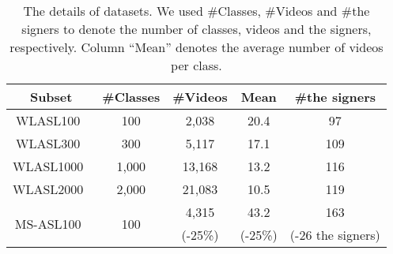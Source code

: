 \documentclass[journal]{IEEEtran}
\begin{document}
\begin{table}[tb]
    \centering
    \caption{The details of datasets. We used \#Classes, \#Videos and \#the signers to denote the number of classes, videos and the signers, respectively. Column ``Mean'' denotes the average number of videos per class.}
    \begin{tabular}{ccccc} \hline
        Subset & \#Classes & \#Videos & Mean & \#the signers \\ \hline \hline
        WLASL100~\cite{li2020word} & 100 & 2,038 & 20.4 & 97 \\
        WLASL300~\cite{li2020word} & 300 & 5,117 & 17.1 & 109\\
        WLASL1000~\cite{li2020word} & 1,000 & 13,168 & 13.2 & 116\\
        WLASL2000~\cite{li2020word} & 2,000 & 21,083 & 10.5 & 119 \\ \hline
        \multirow{2}{*}{MS-ASL100~\cite{vaezi2019ms-asl}} & \multirow{2}{*}{100} & 4,315 & 43.2 & 163 \\
         & & (-25\%) & (-25\%) & (-26 the signers) \\ \hline
    \end{tabular}
    \label{tab:dataset}
\end{table}
\end{document}
